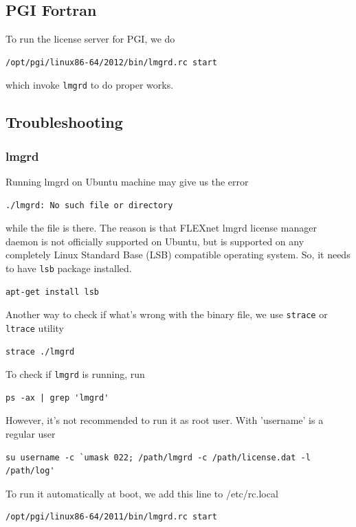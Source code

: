 \subsection{PGI Fortran}

To run the license server for PGI, we do
\begin{verbatim}
/opt/pgi/linux86-64/2012/bin/lmgrd.rc start
\end{verbatim}
which invoke \verb!lmgrd! to do  proper works.

\subsection{Troubleshooting}

\subsubsection{lmgrd}

Running lmgrd on Ubuntu machine may give us the error
\begin{verbatim}
./lmgrd: No such file or directory
\end{verbatim}
while the file is there. The reason is that FLEXnet lmgrd license manager daemon
is not officially supported on Ubuntu, but is supported on any completely Linux
Standard Base (LSB) compatible operating system. So, it needs to have \verb!lsb!
package installed.
\begin{verbatim}
apt-get install lsb
\end{verbatim}

Another way to check if what's wrong with the binary file, we use \verb!strace!
or \verb!ltrace! utility
\begin{verbatim}
strace ./lmgrd
\end{verbatim}

To check if \verb!lmgrd! is running, run
\begin{verbatim}
ps -ax | grep 'lmgrd'
\end{verbatim}

However, it's not recommended to run it as root user. With 'username' is a
regular user
\begin{verbatim}
su username -c `umask 022; /path/lmgrd -c /path/license.dat -l /path/log'
\end{verbatim}

To run it automatically at boot, we add this line to /etc/rc.local
\begin{verbatim}
/opt/pgi/linux86-64/2011/bin/lmgrd.rc start
\end{verbatim}

